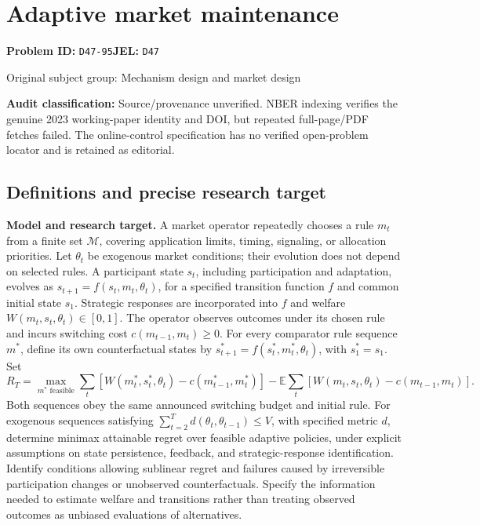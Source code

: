 \documentclass[11pt,a4paper]{article}
\begin{document}
\section*{Adaptive market maintenance}
\textbf{Problem ID:} \texttt{D47-95}\quad \textbf{JEL:} \texttt{D47}\par
\label{problem:OP-0299}
{\sffamily\small\color{muted}Original subject group: Mechanism design and market design\par}
\label{definitions:problem:30007581}
\textbf{Audit classification:} Source/provenance unverified. NBER indexing verifies the genuine 2023 working-paper identity and DOI, but repeated full-page/PDF fetches failed. The online-control specification has no verified open-problem locator and is retained as editorial.
\subsection*{Definitions and precise research target}
\textbf{Model and research target.} A market operator repeatedly chooses a rule \(m_t\) from a finite set \(\mathcal M\), covering application limits, timing, signaling, or allocation priorities. Let \(\theta_t\) be exogenous market conditions; their evolution does not depend on selected rules. A participant state \(s_t\), including participation and adaptation, evolves as \(s_{t+1}=f(s_t,m_t,\theta_t)\), for a specified transition function \(f\) and common initial state \(s_1\). Strategic responses are incorporated into \(f\) and welfare \(W(m_t,s_t,\theta_t)\in[0,1]\). The operator observes outcomes under its chosen rule and incurs switching cost \(c(m_{t-1},m_t)\geq0\). For every comparator rule sequence \(m^*\), define its own counterfactual states by \(s^*_{t+1}=f(s^*_t,m^*_t,\theta_t)\), with \(s^*_1=s_1\). Set
\[
 R_T=\max_{m^*\text{ feasible}}\sum_t[W(m^*_t,s^*_t,\theta_t)-c(m^*_{t-1},m^*_t)]
 -\mathbb E\sum_t[W(m_t,s_t,\theta_t)-c(m_{t-1},m_t)].
\]
Both sequences obey the same announced switching budget and initial rule. For exogenous sequences satisfying \(\sum_{t=2}^T d(\theta_t,\theta_{t-1})\leq V\), with specified metric \(d\), determine minimax attainable regret over feasible adaptive policies, under explicit assumptions on state persistence, feedback, and strategic-response identification. Identify conditions allowing sublinear regret and failures caused by irreversible participation changes or unobserved counterfactuals. Specify the information needed to estimate welfare and transitions rather than treating observed outcomes as unbiased evaluations of alternatives.
\end{document}
